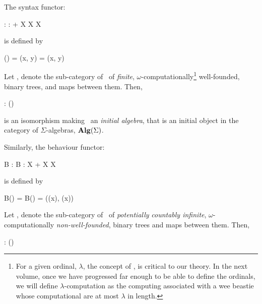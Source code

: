 The syntax functor: 

\placeformula[+]\startformula\startalign
  \NC \Sigma : \NC \Set \rightarrow \Set           \NR
  \NC \Sigma : \NC {} + X \times X \mapsto X \NR
\stopalign\stopformula

\noindent is defined by

\placeformula[+]\startformula\startalign
  \NC \Sigma(\star) \NC =         \NR
  \NC \Sigma(x, y)  \NC = (x, y) \NR
\stopalign\stopformula

\noindent Let \catWFLoL, denote the sub-category of \Set\ of 
\emph{finite}, $\omega$-computationally\footnote{For a given ordinal, 
$\lambda$, the concept of , is 
critical to our theory. In the next volume, once we have progressed far 
enough to be able to define the ordinals, we will define 
$\lambda$-computation as the computing  associated with a wee 
beastie whose computational  are at most $\lambda$ in 
length. } well-founded, binary trees, and maps between them. Then, 

\placesubformula\startformula\startalign
  \NC \Sigma : \catWFLoL \NC \rightarrow \catWFLoL        \NR
  \NC \Sigma(\catWFLoL)  \NC \longRightIsoArrow \catWFLoL \NR
\stopalign\stopformula

\noindent is an isomorphism making \catWFLoL\ an \emph{initial algebra}, 
that is an initial object in the category of $\Sigma$-algebras, 
$\bold{Alg}(\Sigma)$.

Similarly, the behaviour functor: 

\placeformula[+]\startformula\startalign
  \NC B : \NC \Set \rightarrow \Set           \NR
  \NC B : \NC X \mapsto {} + X \times X \NR
\stopalign\stopformula

\noindent is defined by

\placeformula[+]\startformula\startalign
  \NC B() \NC = \star                          \NR
  \NC B()   \NC = ((x), (x)) \NR
\stopalign\stopformula

\noindent Let \catLoL, denote the sub-category of \Set\ of 
\emph{potentially} \emph{countably infinite}, $\omega$-computationally 
\emph{non-well-founded}, binary trees and maps between them. Then, 

\placesubformula\startformula\startalign
  \NC \Sigma : \catLoL \NC \rightarrow \catLoL                \NR
  \NC \catLoL          \NC \longRightIsoArrow \Sigma(\catLoL) \NR
\stopalign\stopformula

